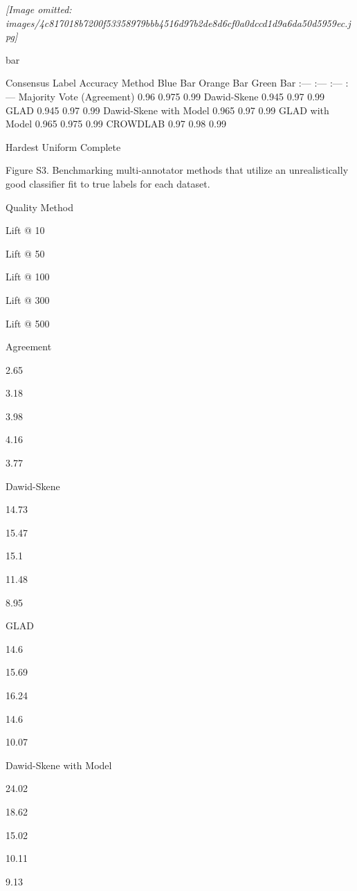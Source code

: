 \documentclass[
]{article}
\begin{document}
\textit{[Image omitted: images/4c817018b7200f53358979bbb4516d97b2de8d6cf0a0dccd1d9a6da50d5959ec.jpg]}

bar

Consensus Label Accuracy \textbar{} Method \textbar{} Blue Bar
\textbar{} Orange Bar \textbar{} Green Bar \textbar{} \textbar{} :---
\textbar{} :--- \textbar{} :--- \textbar{} :--- \textbar{} \textbar{}
Majority Vote (Agreement) \textbar{} 0.96 \textbar{} 0.975 \textbar{}
0.99 \textbar{} \textbar{} Dawid-Skene \textbar{} 0.945 \textbar{} 0.97
\textbar{} 0.99 \textbar{} \textbar{} GLAD \textbar{} 0.945 \textbar{}
0.97 \textbar{} 0.99 \textbar{} \textbar{} Dawid-Skene with Model
\textbar{} 0.965 \textbar{} 0.97 \textbar{} 0.99 \textbar{} \textbar{}
GLAD with Model \textbar{} 0.965 \textbar{} 0.975 \textbar{} 0.99
\textbar{} \textbar{} CROWDLAB \textbar{} 0.97 \textbar{} 0.98
\textbar{} 0.99 \textbar{}

Hardest Uniform Complete

Figure S3. Benchmarking multi-annotator methods that utilize an
unrealistically good classifier fit to true labels for each dataset.

Quality Method

Lift @ 10

Lift @ 50

Lift @ 100

Lift @ 300

Lift @ 500

Agreement

2.65

3.18

3.98

4.16

3.77

Dawid-Skene

14.73

15.47

15.1

11.48

8.95

GLAD

14.6

15.69

16.24

14.6

10.07

Dawid-Skene with Model

24.02

18.62

15.02

10.11

9.13
\end{document}
